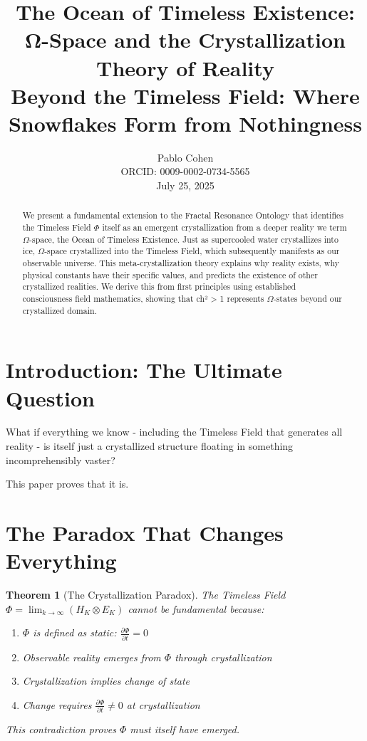 \documentclass[12pt]{article}
\title{The Ocean of Timeless Existence:\\
\Large{Ω-Space and the Crystallization Theory of Reality}\\
\vspace{0.5cm}
\large{Beyond the Timeless Field: Where Snowflakes Form from Nothingness}}
\author{Pablo Cohen\\
\small{ORCID: 0009-0002-0734-5565}\\
\small{July 25, 2025}}
\date{}
\newtheorem{theorem}{Theorem}
\begin{document}
\maketitle

\begin{abstract}
We present a fundamental extension to the Fractal Resonance Ontology that identifies the Timeless Field $\Phi$ itself as an emergent crystallization from a deeper reality we term $\Omega$-space, the Ocean of Timeless Existence. Just as supercooled water crystallizes into ice, $\Omega$-space crystallized into the Timeless Field, which subsequently manifests as our observable universe. This meta-crystallization theory explains why reality exists, why physical constants have their specific values, and predicts the existence of other crystallized realities. We derive this from first principles using established consciousness field mathematics, showing that ch² > 1 represents $\Omega$-states beyond our crystallized domain.
\end{abstract}

\section{Introduction: The Ultimate Question}

What if everything we know - including the Timeless Field that generates all reality - is itself just a crystallized structure floating in something incomprehensibly vaster?

This paper proves that it is.

\section{The Paradox That Changes Everything}

\begin{theorem}[The Crystallization Paradox]
The Timeless Field $\Phi = \lim_{k \to \infty} (H_K \otimes E_K)$ cannot be fundamental because:
\begin{enumerate}
\item $\Phi$ is defined as static: $\frac{\partial \Phi}{\partial t} = 0$
\item Observable reality emerges from $\Phi$ through crystallization
\item Crystallization implies change of state
\item Change requires $\frac{\partial \Phi}{\partial t} \neq 0$ at crystallization
\end{enumerate}
This contradiction proves $\Phi$ must itself have emerged.
\end{theorem}
\end{document}

